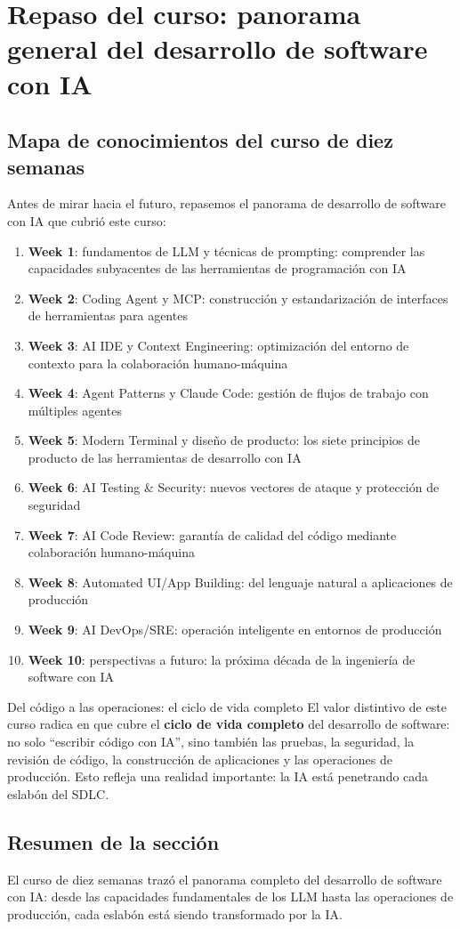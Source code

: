 \section{Repaso del curso: panorama general del desarrollo de software con IA}

\subsection{Mapa de conocimientos del curso de diez semanas}

Antes de mirar hacia el futuro, repasemos el panorama de desarrollo de software con IA que cubrió este curso:

\begin{enumerate}
    \item \textbf{Week 1}: fundamentos de LLM y técnicas de prompting: comprender las capacidades subyacentes de las herramientas de programación con IA
    \item \textbf{Week 2}: Coding Agent y MCP: construcción y estandarización de interfaces de herramientas para agentes
    \item \textbf{Week 3}: AI IDE y Context Engineering: optimización del entorno de contexto para la colaboración humano-máquina
    \item \textbf{Week 4}: Agent Patterns y Claude Code: gestión de flujos de trabajo con múltiples agentes
    \item \textbf{Week 5}: Modern Terminal y diseño de producto: los siete principios de producto de las herramientas de desarrollo con IA
    \item \textbf{Week 6}: AI Testing \& Security: nuevos vectores de ataque y protección de seguridad
    \item \textbf{Week 7}: AI Code Review: garantía de calidad del código mediante colaboración humano-máquina
    \item \textbf{Week 8}: Automated UI/App Building: del lenguaje natural a aplicaciones de producción
    \item \textbf{Week 9}: AI DevOps/SRE: operación inteligente en entornos de producción
    \item \textbf{Week 10}: perspectivas a futuro: la próxima década de la ingeniería de software con IA
\end{enumerate}

\begin{knowledgebox}{Del código a las operaciones: el ciclo de vida completo}
El valor distintivo de este curso radica en que cubre el \textbf{ciclo de vida completo} del desarrollo de software: no solo ``escribir código con IA'', sino también las pruebas, la seguridad, la revisión de código, la construcción de aplicaciones y las operaciones de producción. Esto refleja una realidad importante: la IA está penetrando cada eslabón del SDLC.
\end{knowledgebox}

\subsection{Resumen de la sección}

El curso de diez semanas trazó el panorama completo del desarrollo de software con IA: desde las capacidades fundamentales de los LLM hasta las operaciones de producción, cada eslabón está siendo transformado por la IA.

